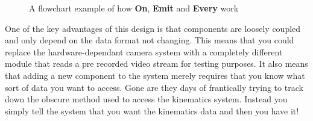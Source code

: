 \documentclass[english,12pt]{scrartcl}
\begin{document}
\begin{figure}[b]
                \caption {A flowchart example of how \textbf{On}, \textbf{Emit} and \textbf{Every} work} \label{fig:OnAndEmitExample}
            \end{figure}
            
            One of the key advantages of this design is that components are loosely coupled and only depend on the data format not changing. This means that you could replace the
            hardware-dependant camera system with a completely different module that reads a pre recorded video stream for testing purposes. It also means that adding a new
            component to the system merely requires that you know what sort of data you want to access. Gone are they days of frantically trying to track down the obscure
            method used to access the kinematics system. Instead you simply tell the system that you want the kinematics data and then you have it!
            
\end{document}
